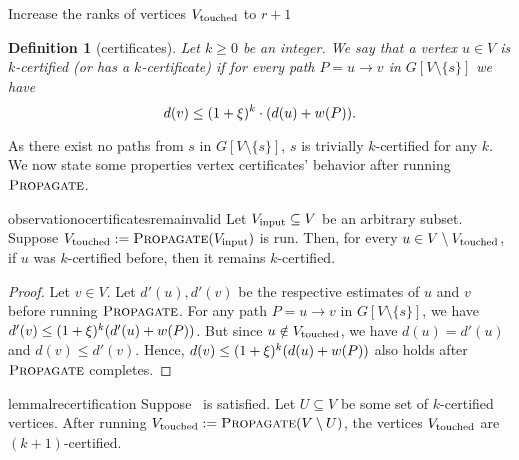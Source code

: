 \documentclass[11pt,letterpaper]{article}
\theoremstyle{plain}
\newtheorem{definition}[theorem]{Definition}
\newcommand{\wei}{w}
\newcommand{\set}[1]{\left\lbrace #1 \right\rbrace}
\DeclareMathOperator*{\PD}{\textsc{Propagate}}
\begin{document}
\begin{algorithm}[t]
\caption{($e=sv$)}\label{alg:insert}
\begin{algorithmic}[1]
  \State{$E := E \cup \set{e}$}
  \If{$d(v) > (1 + \epsp)\wei(e)$}
    \State{$d(v) := \wei(e)$}
    \State{$\Vtouch := \PD(\set{v})$} \label{line:propagation}
    \State Increase the ranks of vertices $V_{\mathrm{touched}}$ to $r+1$\label{line:recertify}
    \label{line:synchronize}
  \EndIf
\end{algorithmic}
\end{algorithm} 
\begin{definition}[certificates]\label{def:cert}
Let $k\geq 0$ be an integer.
We say that a vertex $u \in V$ is $k$-certified (or has a $k$-certificate) if for every path $P = u \to v$ in $G[V\setminus \{s\}]$ we have
\[d(v)\leq (1+\epsp)^k\cdot (d(u)+\wei(P)).\] 
\end{definition}
As there exist no paths from $s$ in $G[V\setminus\{s\}]$, $s$ is trivially $k$-certified for any $k$. We now state
some properties vertex certificates' behavior after running $\PD$.
\begin{restatable}{observation}{ocertificatesremainvalid}\label{certificates_remain_valid}
Let $V_{\mathrm{input}}\subseteq V$ be an arbitrary subset. Suppose $\Vtouch:=\PD(\Vinput)$ is run.
Then, for every $u\in V \setminus V_{\mathrm{touched}}$, if $u$ was $k$-certified before, then it remains $k$-certified.
\end{restatable}
\begin{proof}
  Let $v\in V$. Let $d'(u),d'(v)$ be the respective estimates of $u$ and $v$ before running $\PD$. For any path $P=u\to v$ in $G[V\setminus\{s\}]$, we have $d'(v)\leq (1+\epsp)^k(d'(u)+\wei(P))$.
  But since $u\notin V_{\mathrm{touched}}$, we have $d(u)=d'(u)$ and $d(v)\leq d'(v)$. Hence,
  $d(v)\leq (1+\epsp)^k(d(u)+\wei(P))$ also holds after $\PD$ completes.
\end{proof}
\begin{restatable}{lemma}{lrecertification}\label{recertification_theorem}
Suppose~ is satisfied.
Let $U \subseteq V$ be some set of $k$-certified vertices.
After running ${\Vtouch:=\PD(V \setminus U)}$, the vertices $V_{\mathrm{touched}}$ are $(k + 1)$-certified.
\end{restatable}
\end{document}
